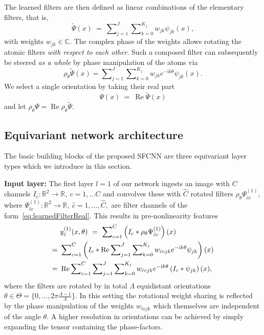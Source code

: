 \documentclass[10pt,twocolumn,letterpaper]{article}
\newcommand{\real}{\operatorname{Re}}
\newcommand{\ci}{\mathrm{i}}
\newcommand{\R}{\mathbb{R}}
\newcommand{\C}{\mathbb{C}}
\newcommand{\myparagraph}[1]{\vspace*{1ex}\noindent\textbf{#1}}
\begin{document}
The learned filters are then defined as linear combinations of the elementary filters, that is,
\vspace{-.4ex}
\begin{equation}\label{eq:combinedFilter}
	\tilde{\Psi}(x)\ =\ \sum\nolimits_{j=1}^{J} \sum\nolimits_{k=0}^{K_j} w_{jk} \psi_{jk}(x),
\end{equation}
with weights $w_{jk} \in \C.$ The complex phase of the weights allows rotating the atomic filters \emph{with respect to each other}.
Such a composed filter can subsequently be steered \emph{as a whole} by phase manipulation of the atoms via
\vspace{-.4ex}
\begin{equation}
	\rho_\theta \tilde{\Psi}(x) = \sum\nolimits_{j=1}^{J} \sum\nolimits_{k=0}^{K_j} w_{jk} e^{-\ci k\theta} \psi_{jk}(x).
\end{equation}
We select a single orientation
by taking their real part
\vspace{-.4ex}
\begin{equation}\label{eq:learnedFilterReal}
	\Psi(x)\ =\ \real\tilde{\Psi}(x)
\end{equation}
and let $\rho_\theta\Psi = \real\rho_\theta\tilde{\Psi}$.



\subsection{Equivariant network architecture}

\noindent
The basic building blocks of the proposed SFCNN are three equivariant layer types which we introduce in this section.

\myparagraph{Input layer:}
The first layer $l=1$ of our network ingests an image with $C$ channels $I_c:\mathbb{R}^2\to\mathbb{R},\ c=1,\ldots C$ and convolves these with $\hat{C}$ rotated filters $\rho_\theta \Psi_{\hat{c}c}^{(1)},$ where $\Psi_{\hat{c}c}^{(1)}:\R^2\to\R,\ \hat{c}=1,\ldots,\hat{C},$ are filter channels of the form~\eqref{eq:learnedFilterReal}.
This results in pre-nonlinearity features
 \begin{align}\label{eq:firstLayer}
	&\ y_{\hat{c}}^{(1)}(x,\theta)\ =\ \sum\nolimits_{c=1}^{C} \left(I_c \ast \rho_\theta\Psi_{\hat{c}c}^{(1)}\right)(x) \\
	=&\ \sum\nolimits_{c=1}^{C}  \left(I_c \ast \real \sum\nolimits_{j=1}^{J} \sum\nolimits_{k=0}^{K_j}w_{\hat{c}cjk} e^{-\ci k\theta} \psi_{jk}\right)(x)\notag\\
	=&\ \real \sum\nolimits_{c=1}^{C}\sum\nolimits_{j=1}^J\sum\nolimits_{k=0}^{K_j} w_{\hat{c}cjk} e^{-\ci k\theta} \left(I_c * \psi_{jk}\right)(x)\notag,
\end{align}
where the filters are rotated by in total $\Lambda$ equidistant orientations $\theta \in \Theta = \{ 0, \ldots, 2\pi\frac{\Lambda-1}{\Lambda} \}$.
In this setting the rotational weight sharing is reflected by the phase manipulation of the weights $w_{\hat{c}cjk}$ which themselves are independent of the angle $\theta$.
A higher resolution in orientations can be achieved by simply expanding the tensor containing the phase-factors.
\end{document}
